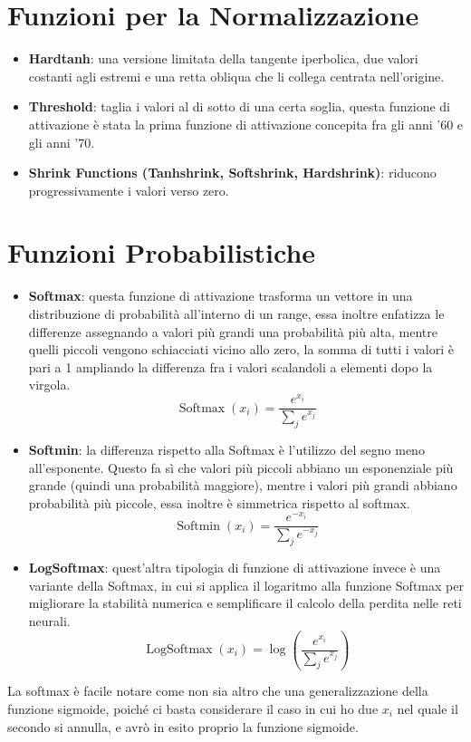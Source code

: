 \section{Funzioni per la Normalizzazione}
\begin{itemize}
    \item \textbf{Hardtanh}: una versione limitata della tangente iperbolica, due valori costanti agli estremi e una retta obliqua che li collega centrata nell'origine.
    \item \textbf{Threshold}: taglia i valori al di sotto di una certa soglia, questa funzione di attivazione è stata la prima funzione di attivazione concepita fra gli anni '60 e gli anni '70.
    \item \textbf{Shrink Functions (Tanhshrink, Softshrink, Hardshrink)}: riducono progressivamente i valori verso zero.
\end{itemize}

\section{Funzioni Probabilistiche}
\begin{itemize}
    \item \textbf{Softmax}: questa funzione di attivazione trasforma un vettore in una distribuzione di probabilità all'interno di un range, essa inoltre enfatizza le differenze assegnando a valori più grandi una probabilità più alta, mentre quelli piccoli vengono schiacciati vicino allo zero, la somma di tutti i valori è pari a 1 ampliando la differenza fra i valori scalandoli a elementi dopo la virgola.
    \begin{equation}
        \operatorname{Softmax}(x_i) = \frac{e^{x_i}}{\sum_je^{x_j}}
    \end{equation}
    \item \textbf{Softmin}: la differenza rispetto alla Softmax è l'utilizzo del segno meno all'esponente. Questo fa sì che valori più piccoli abbiano un esponenziale più grande (quindi una probabilità maggiore), mentre i valori più grandi abbiano probabilità più piccole, essa inoltre è simmetrica rispetto al softmax.
    \begin{equation}
        \operatorname{Softmin}(x_i) = \frac{e^{-x_i}}{\sum_je^{-x_j}}
    \end{equation}
    \item \textbf{LogSoftmax}: quest'altra tipologia di funzione di attivazione invece è una variante della Softmax, in cui si applica il logaritmo alla funzione Softmax per migliorare la stabilità numerica e semplificare il calcolo della perdita nelle reti neurali.
    \begin{equation}
        \operatorname{LogSoftmax}(x_i) =\log( \frac{e^{x_i}}{\sum_je^{x_j}})
    \end{equation}
\end{itemize}

\begin{Osservazione}
    La softmax è facile notare come non sia altro che una generalizzazione della funzione sigmoide, poiché ci basta considerare il caso in cui ho due $x_i$ nel quale il secondo si annulla, e avrò in esito proprio la funzione sigmoide.
\end{Osservazione}
